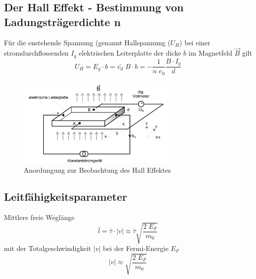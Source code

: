 \subsection{Der Hall Effekt - Bestimmung von Ladungsträgerdichte n}
Für die enstehende Spannung (genannt Hallspannung ($U_H$) bei einer stromdurchflossenden $I_q$
elektrischen Leiterplatte der dicke $b$ im Magnetfeld $\vec{B}$ gilt
\begin{equation}
    U_H=E_y \cdot b = \bar{v_d}\;B\cdot b = -\frac{1}{n \; e_0}\frac{B \cdot I_q}{d}
    \label{eqn:U_Hall}
\end{equation}
\begin{figure}[H]
    \centering
    \includegraphics[width=0.7\textwidth]{bilder/HAll.jpg}
    \caption{Anordungung zur Beobachtung des Hall Effektes \cite[265]{Anleitung}}
    \label{fig:hall}
\end{figure}



\subsection{Leitfähigkeitsparameter}
Mittlere freie Weglänge 
\begin{equation}
    \bar{l}=\bar{\tau} \cdot |v| \approx \bar{\tau}\sqrt{\frac{2\;E_F}{m_0}}  
\end{equation}
mit der Totalgeschwindigkeit $|v|$ bei der Fermi-Energie $E_F$
\begin{equation}
    |v|\approx \sqrt{\frac{2\;E_F}{m_0}}    
\end{equation} 






